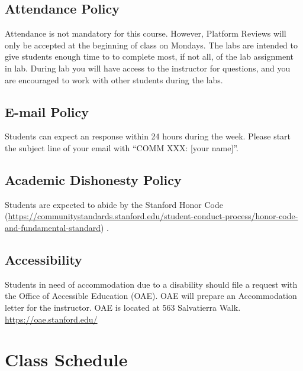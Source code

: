 \documentclass[11pt,]{article}
\begin{document}
\hypertarget{attendance-policy}{%
\subsection{Attendance Policy}\label{attendance-policy}}

Attendance is not mandatory for this course. However, Platform Reviews
will only be accepted at the beginning of class on Mondays. The labs are
intended to give students enough time to to complete most, if not all,
of the lab assignment in lab. During lab you will have access to the
instructor for questions, and you are encouraged to work with other
students during the labs.

\hypertarget{e-mail-policy}{%
\subsection{E-mail Policy}\label{e-mail-policy}}

Students can expect an response within 24 hours during the week. Please
start the subject line of your email with ``COMM XXX: {[}your name{]}''.

\hypertarget{academic-dishonesty-policy}{%
\subsection{Academic Dishonesty
Policy}\label{academic-dishonesty-policy}}

Students are expected to abide by the Stanford Honor Code
(\url{https://communitystandards.stanford.edu/student-conduct-process/honor-code-and-fundamental-standard})
.

\hypertarget{accessibility}{%
\subsection{Accessibility}\label{accessibility}}

Students in need of accommodation due to a disability should file a
request with the Office of Accessible Education (OAE). OAE will prepare
an Accommodation letter for the instructor. OAE is located at 563
Salvatierra Walk. \url{https://oae.stanford.edu/}

\newpage

\hypertarget{class-schedule}{%
\section{Class Schedule}\label{class-schedule}}
\end{document}
